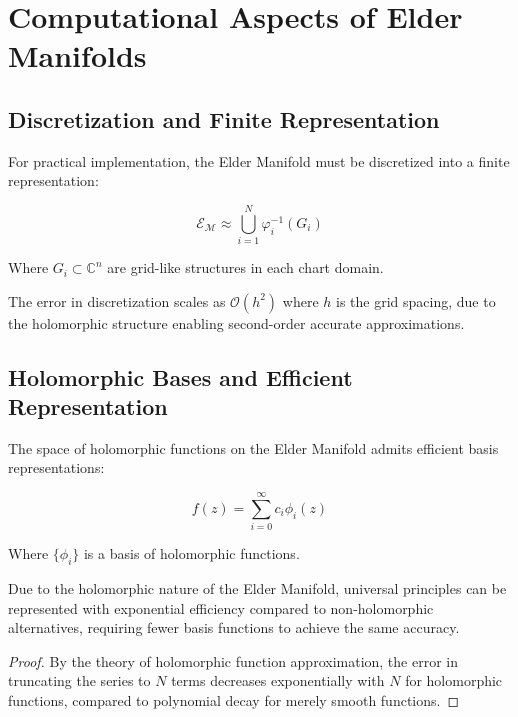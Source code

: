 \section{Computational Aspects of Elder Manifolds}

\subsection{Discretization and Finite Representation}

For practical implementation, the Elder Manifold must be discretized into a finite representation:

\begin{equation}
\mathcal{E}_{\mathcal{M}} \approx \bigcup_{i=1}^N \varphi_i^{-1}(G_i)
\end{equation}

Where $G_i \subset \mathbb{C}^n$ are grid-like structures in each chart domain.

\begin{proposition}
The error in discretization scales as $\mathcal{O}(h^2)$ where $h$ is the grid spacing, due to the holomorphic structure enabling second-order accurate approximations.
\end{proposition}

\subsection{Holomorphic Bases and Efficient Representation}

The space of holomorphic functions on the Elder Manifold admits efficient basis representations:

\begin{equation}
f(z) = \sum_{i=0}^{\infty} c_i \phi_i(z)
\end{equation}

Where $\{\phi_i\}$ is a basis of holomorphic functions.

\begin{theorem}
Due to the holomorphic nature of the Elder Manifold, universal principles can be represented with exponential efficiency compared to non-holomorphic alternatives, requiring fewer basis functions to achieve the same accuracy.
\end{theorem}

\begin{proof}
By the theory of holomorphic function approximation, the error in truncating the series to $N$ terms decreases exponentially with $N$ for holomorphic functions, compared to polynomial decay for merely smooth functions.
\end{proof}

